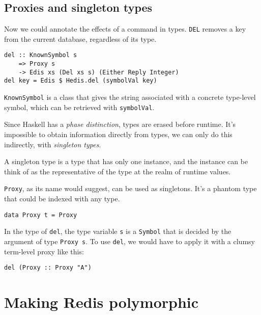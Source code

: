 \documentclass[pldi]{sigplanconf-pldi16}
\begin{document}
\subsection{Proxies and singleton types}

Now we could annotate the effects of a command in types. \texttt{DEL}
 removes a key from the current database, regardless of its type.

\begin{verbatim}
del :: KnownSymbol s
    => Proxy s
    -> Edis xs (Del xs s) (Either Reply Integer)
del key = Edis $ Hedis.del (symbolVal key)
\end{verbatim}

\texttt{KnownSymbol} is a class that gives the string associated
 with a concrete type-level symbol, which can be retrieved with
 \texttt{symbolVal}.\footnotemark


Since Haskell has a \emph{phase distinction}\cite{phasedistinction}, types are
 erased before runtime. It's impossible to obtain information directly from
 types, we can only do this indirectly, with
 \emph{singleton types}\cite{singletons}.

A singleton type is a type that has only one instance, and the instance can be
 think of as the representative of the type at the realm of runtime values.

\texttt{Proxy}, as its name would suggest, can be used as
 singletons. It's a phantom type that could be indexed with any type.

\begin{verbatim}
data Proxy t = Proxy
\end{verbatim}

In the type of \texttt{del}, the type variable
 \texttt{s} is a \texttt{Symbol} that is decided by
 the argument of type \texttt{Proxy s}.
 To use \texttt{del}, we would have to apply it with a clumsy
 term-level proxy like this:

\begin{verbatim}
del (Proxy :: Proxy "A")
\end{verbatim}

\section{Making Redis polymorphic}
\end{document}
